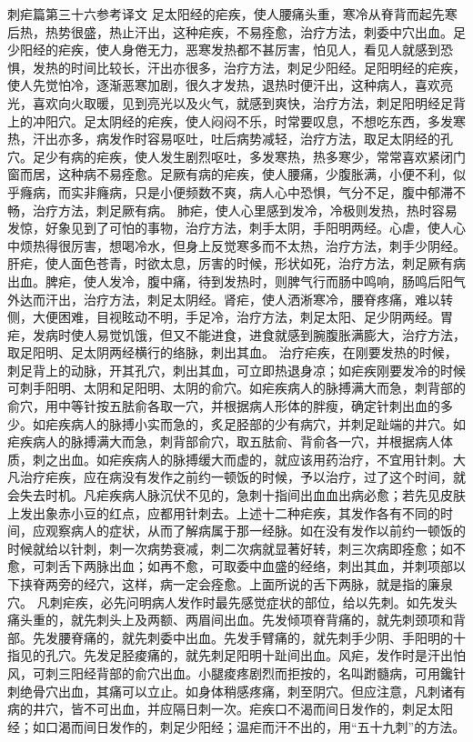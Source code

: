 \documentclass[a4paper,12pt,UTF8,twoside]{ctexbook}
\begin{document}
刺疟篇第三十六参考译文
足太阳经的疟疾，使人腰痛头重，寒冷从脊背而起先寒后热，热势很盛，热止汗出，这种疟疾，不易痊愈，治疗方法，刺委中穴出血。足少阳经的疟疾，使人身倦无力，恶寒发热都不甚厉害，怕见人，看见人就感到恐惧，发热的时间比较长，汗出亦很多，治疗方法，刺足少阳经。足阳明经的疟疾，使人先觉怕冷，逐渐恶寒加剧，很久才发热，退热时便汗出，这种病人，喜欢亮光，喜欢向火取暖，见到亮光以及火气，就感到爽快，治疗方法，刺足阳明经足背上的冲阳穴。足太阴经的疟疾，使人闷闷不乐，时常要叹息，不想吃东西，多发寒热，汗出亦多，病发作时容易呕吐，吐后病势减轻，治疗方法，取足太阴经的孔穴。足少有病的疟疾，使人发生剧烈呕吐，多发寒热，热多寒少，常常喜欢紧闭门窗而居，这种病不易痊愈。足厥有病的疟疾，使人腰痛，少腹胀满，小便不利，似乎癃病，而实非癃病，只是小便频数不爽，病人心中恐惧，气分不足，腹中郁滞不畅，治疗方法，刺足厥有病。
肺疟，使人心里感到发冷，冷极则发热，热时容易发惊，好象见到了可怕的事物，治疗方法，刺手太阴，手阳明两经。心虐，使人心中烦热得很厉害，想喝冷水，但身上反觉寒多而不太热，治疗方法，刺手少阴经。肝疟，使人面色苍青，时欲太息，厉害的时候，形状如死，治疗方法，刺足厥有病出血。脾疟，使人发冷，腹中痛，待到发热时，则脾气行而肠中鸣响，肠鸣后阳气外达而汗出，治疗方法，刺足太阴经。肾疟，使人洒淅寒冷，腰脊疼痛，难以转侧，大便困难，目视眩动不明，手足冷，治疗方法，刺足太阳、足少阴两经。胃疟，发病时使人易觉饥饿，但又不能进食，进食就感到腕腹胀满膨大，治疗方法，取足阳明、足太阴两经横行的络脉，刺出其血。
治疗疟疾，在刚要发热的时候，刺足背上的动脉，开其孔穴，刺出其血，可立即热退身凉；如疟疾刚要发冷的时候可刺手阳明、太阴和足阳明、太阴的俞穴。如疟疾病人的脉搏满大而急，刺背部的俞穴，用中等针按五胠俞各取一穴，并根据病人形体的胖瘦，确定针刺出血的多少。如疟疾病人的脉搏小实而急的，炙足胫部的少有病穴，并刺足趾端的井穴。如疟疾病人的脉搏满大而急，刺背部俞穴，取五胠俞、背俞各一穴，并根据病人体质，刺之出血。如疟疾病人的脉搏缓大而虚的，就应该用药治疗，不宜用针刺。大凡治疗疟疾，应在病没有发作之前约一顿饭的时候，予以治疗，过了这个时间，就会失去时机。凡疟疾病人脉沉伏不见的，急刺十指间出血血出病必愈；若先见皮肤上发出象赤小豆的红点，应都用针刺去。上述十二种疟疾，其发作各有不同的时间，应观察病人的症状，从而了解病属于那一经脉。如在没有发作以前约一顿饭的时候就给以针刺，刺一次病势衰减，刺二次病就显著好转，刺三次病即痊愈；如不愈，可刺舌下两脉出血；如再不愈，可取委中血盛的经络，刺出其血，并刺项部以下挟脊两旁的经穴，这样，病一定会痊愈。上面所说的舌下两脉，就是指的廉泉穴。
凡刺疟疾，必先问明病人发作时最先感觉症状的部位，给以先刺。如先发头痛头重的，就先刺头上及两额、两眉间出血。先发倾项脊背痛的，就先刺颈项和背部。先发腰脊痛的，就先刺委中出血。先发手臂痛的，就先刺手少阴、手阳明的十指见的孔穴。先发足胫痠痛的，就先刺足阳明十趾间出血。风疟，发作时是汗出怕风，可刺三阳经背部的俞穴出血。小腿痠疼剧烈而拒按的，名叫跗髓病，可用鑱针刺绝骨穴出血，其痛可以立止。如身体稍感疼痛，刺至阴穴。但应注意，凡刺诸有病的井穴，皆不可出血，并应隔日刺一次。疟疾口不渴而间日发作的，刺足太阳经；如口渴而间日发作的，刺足少阳经；温疟而汗不出的，用“五十九刺”的方法。
\end{document}
